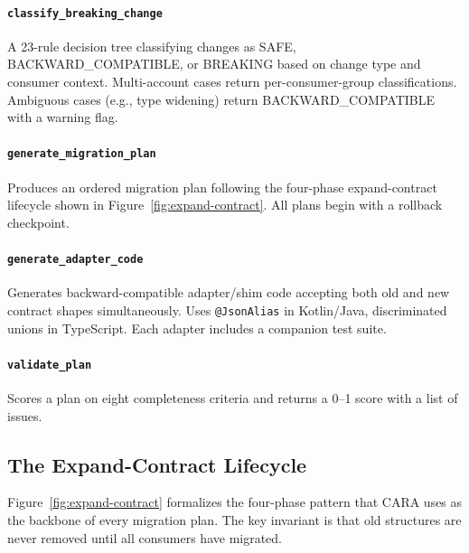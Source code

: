 \documentclass[10pt,twocolumn]{article}
\begin{document}
\paragraph{\texttt{classify\_breaking\_change}} A 23-rule decision tree
classifying changes as SAFE, BACKWARD\_COMPATIBLE, or BREAKING based on change
type and consumer context. Multi-account cases return per-consumer-group
classifications. Ambiguous cases (e.g., type widening) return
BACKWARD\_COMPATIBLE with a warning flag.

\paragraph{\texttt{generate\_migration\_plan}} Produces an ordered migration
plan following the four-phase expand-contract lifecycle shown in
Figure~\ref{fig:expand-contract}. All plans begin with a rollback checkpoint.

\paragraph{\texttt{generate\_adapter\_code}} Generates backward-compatible
adapter/shim code accepting both old and new contract shapes simultaneously.
Uses \texttt{@JsonAlias} in Kotlin/Java, discriminated unions in TypeScript.
Each adapter includes a companion test suite.

\paragraph{\texttt{validate\_plan}} Scores a plan on eight completeness
criteria and returns a 0--1 score with a list of issues.

\subsection{The Expand-Contract Lifecycle}

Figure~\ref{fig:expand-contract} formalizes the four-phase pattern that CARA
uses as the backbone of every migration plan. The key invariant is that
old structures are never removed until all consumers have migrated.
\end{document}
